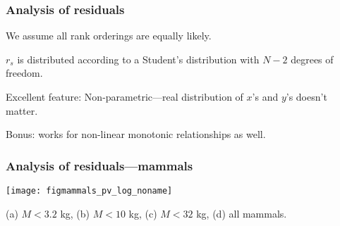 \begin{frame}
  \frametitle{Analysis of residuals}

We assume all rank orderings are equally likely.

$r_s$ is distributed according to a Student's distribution
with $N-2$ degrees of freedom.

Excellent feature: Non-parametric---real distribution
of $x$'s and $y$'s doesn't matter.

Bonus: works for non-linear monotonic relationships as well.

{\tiny {}}

\inv

\vis

\end{frame}

\begin{frame}
  \frametitle{Analysis of residuals---mammals}

  \vspace{5mm}
  \begin{center}
    \texttt{[image: figmammals\_pv\_log\_noname]}
  \end{center}
{\small (a) $M<3.2$ kg, (b) $M<10$ kg, (c) $M<32$ kg, (d) all mammals.}



\end{frame}

